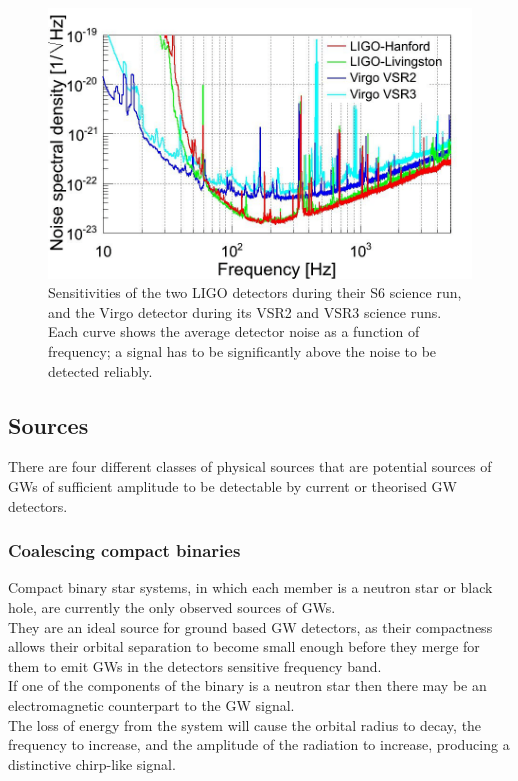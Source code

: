 \documentclass[binding=0.6cm, LaM]{sapthesis}
\begin{document}
		\begin{figure}
                	\includegraphics[scale=0.3]{noiseone}
                	\centering
                	\caption{Sensitivities of the two LIGO detectors during their S6 science run, 
				 and the Virgo detector during its VSR2 and VSR3 science runs. 
				 Each curve shows the average detector noise as a function of frequency; 
				 a signal has to be significantly above the noise to be detected reliably.}
                	\label{fig:noiseone}
                \end{figure}

\subsection{Sources}

	There are four different classes of physical sources 
	that are potential sources of GWs 
	of sufficient amplitude to be detectable 
	by current or theorised GW detectors. 

\subsubsection{Coalescing compact binaries}

	Compact binary star systems, in which each member is a neutron star or black hole, 
	are currently the only observed sources of GWs. \\
	They are an ideal source for ground based GW detectors, 
	as their compactness allows their orbital separation to become 
	small enough before they merge for them to emit GWs in the detectors sensitive frequency band. \\
	If one of the components of the binary is a neutron star 
	then there may be an electromagnetic counterpart to the GW signal. \\
	The loss of energy from the system will cause the orbital radius to decay, 
	the frequency to increase, and the amplitude of the radiation to increase, 
	producing a distinctive chirp-like signal. 
	
\end{document}
